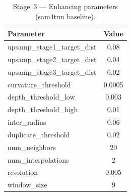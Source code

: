 \documentclass[a4paper,fleqn]{cas-dc}
\begin{document}
{\begin{table}[ht]
\caption{Stage~3 --- Enhancing parameters (sam4tun baseline).}\label{tab:enhance-params}
\begin{tabular*}{\tblwidth}{@{} l c @{}}
\toprule
Parameter & Value \\
\midrule
upsamp\_stage1\_target\_dist & 0.08 \\
upsamp\_stage2\_target\_dist & 0.04 \\
upsamp\_stage3\_target\_dist & 0.02 \\
curvature\_threshold & 0.0005 \\
depth\_threshold\_low & 0.003 \\
depth\_threshold\_high & 0.01 \\
inter\_radius & 0.06 \\
duplicate\_threshold & 0.02 \\
num\_neighbors & 20 \\
num\_interpolations & 2 \\
resolution & 0.005 \\
window\_size & 9 \\
\bottomrule
\end{tabular*}
\end{table}

}
\end{document}
